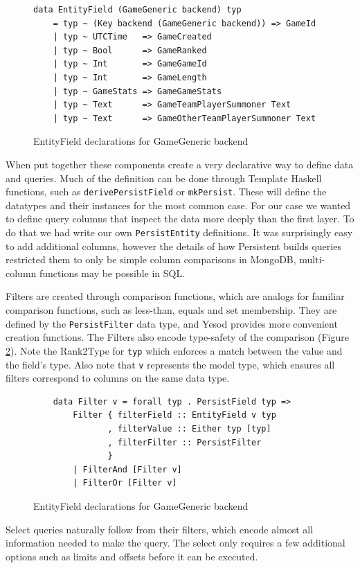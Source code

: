 \documentclass{chi2009}
\newcommand{\code}[1]{\texttt{#1}}
\begin{document}
\begin{figure}[]
\begin{verbatim}
data EntityField (GameGeneric backend) typ
    = typ ~ (Key backend (GameGeneric backend)) => GameId 
    | typ ~ UTCTime   => GameCreated
    | typ ~ Bool      => GameRanked
    | typ ~ Int       => GameGameId
    | typ ~ Int       => GameLength
    | typ ~ GameStats => GameGameStats
    | typ ~ Text      => GameTeamPlayerSummoner Text
    | typ ~ Text      => GameOtherTeamPlayerSummoner Text
\end{verbatim}
    \caption{EntityField declarations for GameGeneric backend}
    \label{EntityField}
\end{figure}

When put together these components create a very declarative way to define data and queries.  Much of the definition can be done through Template Haskell functions, such as \code{derivePersistField} or \code{mkPersist}.  These will define the datatypes and their instances for the most common case.  For our case we wanted to define query columns that inspect the data more deeply than the first layer.  To do that we had write our own \code{PersistEntity} definitions.  It was surprisingly easy to add additional columns, however the details of how Persistent builds queries restricted them to only be simple column comparisons in MongoDB, multi-column functions may be possible in SQL.

Filters are created through comparison functions, which are analogs for familiar comparison functions, such as less-than, equals and set membership.  They are defined by the \code{PersistFilter} data type, and Yesod provides more convenient creation functions.  The Filters also encode type-safety of the comparison (Figure \ref{Filter}).  Note the Rank2Type for \code{typ} which enforces a match between the value and the field's type.  Also note that \code{v} represents the model type, which ensures all filters correspond to columns on the same data type.
\begin{figure}[]
\begin{verbatim}
    data Filter v = forall typ . PersistField typ => 
        Filter { filterField :: EntityField v typ
               , filterValue :: Either typ [typ]
               , filterFilter :: PersistFilter
               }
        | FilterAnd [Filter v]
        | FilterOr [Filter v]
\end{verbatim}
    \caption{EntityField declarations for GameGeneric backend}
    \label{Filter}
\end{figure}
Select queries naturally follow from their filters, which encode almost all information needed to make the query.  The select only requires a few additional options such as limits and offsets before it can be executed.
\end{document}
